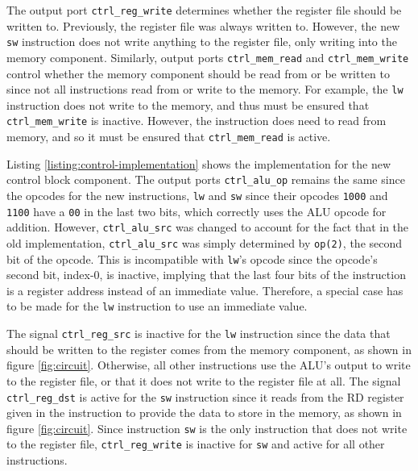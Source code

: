 \documentclass[11pt]{report}
\begin{document}
The output port \verb|ctrl_reg_write| determines whether the register file should be written to.
Previously, the register file was always written to. However, the new \verb|sw| instruction does not
write anything to the register file, only writing into the memory component. Similarly, output ports
\verb|ctrl_mem_read| and \verb|ctrl_mem_write| control whether the memory component should be read
from or be written to since not all instructions read from or write to the memory. For example, the
\verb|lw| instruction does not write to the memory, and thus must be ensured that
\verb|ctrl_mem_write| is inactive. However, the instruction does need to read from memory, and so
it must be ensured that \verb|ctrl_mem_read| is active.



Listing \ref{listing:control-implementation} shows the implementation for the new control block
component. The output ports \verb|ctrl_alu_op| remains the same since the opcodes for the new
instructions, \verb|lw| and \verb|sw| since their opcodes \verb|1000| and \verb|1100| have a
\verb|00| in the last two bits, which correctly uses the ALU opcode for addition. However,
\verb|ctrl_alu_src| was changed to account for the fact that in the old implementation,
\verb|ctrl_alu_src| was simply determined by \verb|op(2)|, the second bit of the opcode. This is
incompatible with \verb|lw|'s opcode since the opcode's second bit, index-0, is inactive, implying
that the last four bits of the instruction is a register address instead of an immediate value.
Therefore, a special case has to be made for the \verb|lw| instruction to use an immediate value.

The signal \verb|ctrl_reg_src| is inactive for the \verb|lw| instruction since the data that should
be written to the register comes from the memory component, as shown in figure \ref{fig:circuit}.
Otherwise, all other instructions use the ALU's output to write to the register file, or that it
does not write to the register file at all. The signal \verb|ctrl_reg_dst| is active for the
\verb|sw| instruction since it reads from the RD register given in the instruction to provide the
data to store in the memory, as shown in figure \ref{fig:circuit}. Since instruction \verb|sw| is
the only instruction that does not write to the register file, \verb|ctrl_reg_write| is inactive for
\verb|sw| and active for all other instructions.
\end{document}
